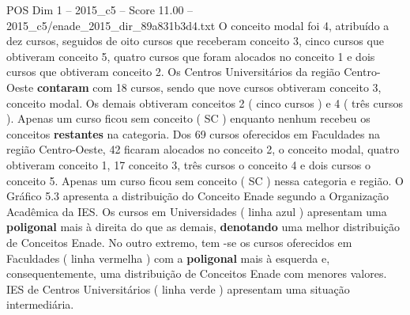 \begin{textsample}{POS Dim 1 – 2015\_c5 – Score 11.00 – 2015\_c5/enade\_2015\_dir\_89a831b3d4.txt}
O conceito modal foi 4, atribuído a dez cursos, seguidos de oito cursos que receberam conceito 3, cinco cursos que obtiveram conceito 5, quatro cursos que foram alocados no conceito 1 e dois cursos que obtiveram conceito 2.
Os Centros Universitários da região Centro-Oeste \textbf{contaram} com 18 cursos, sendo que nove cursos obtiveram conceito 3, conceito modal.
Os demais obtiveram conceitos 2 ( cinco cursos ) e 4 ( três cursos ).
Apenas um curso ficou sem conceito ( SC ) enquanto nenhum recebeu os conceitos \textbf{restantes} na categoria.
Dos 69 cursos oferecidos em Faculdades na região Centro-Oeste, 42 ficaram alocados no conceito 2, o conceito modal, quatro obtiveram conceito 1, 17 conceito 3, três cursos o conceito 4 e dois cursos o conceito 5.
Apenas um curso ficou sem conceito ( SC ) nessa categoria e região.
O Gráfico 5.3 apresenta a distribuição do Conceito Enade segundo a Organização Acadêmica da IES.
Os cursos em Universidades ( linha azul ) apresentam uma \textbf{poligonal} mais à direita do que as demais, \textbf{denotando} uma melhor distribuição de Conceitos Enade.
No outro extremo, tem -se os cursos oferecidos em Faculdades ( linha vermelha ) com a \textbf{poligonal} mais à esquerda e, consequentemente, uma distribuição de Conceitos Enade com menores valores.
IES de Centros Universitários ( linha verde ) apresentam uma situação intermediária.

\end{textsample}
